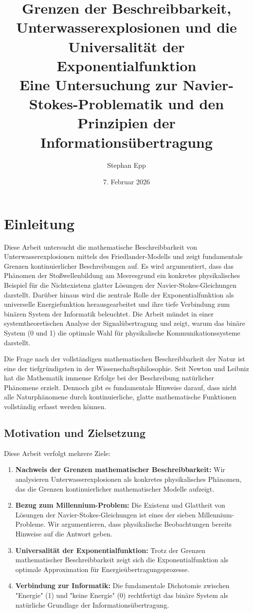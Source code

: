 ﻿\documentclass[12pt,a4paper]{article}
\title{\textbf{Grenzen der Beschreibbarkeit, Unterwasserexplosionen und die Universalität der Exponentialfunktion}\\
Eine Untersuchung zur Navier-Stokes-Problematik und den Prinzipien der Informationsübertragung}
\author{Stephan Epp}
\date{7. Februar 2026}
\theoremstyle{definition}
\theoremstyle{remark}
\begin{document}
\maketitle
\tableofcontents
\newpage

\section{Einleitung}
Diese Arbeit untersucht die mathematische Beschreibbarkeit von Unterwasserexplosionen mittels des Friedlander-Modells und zeigt fundamentale Grenzen kontinuierlicher Beschreibungen auf. Es wird argumentiert, dass das Phänomen der Stoßwellenbildung am Meeresgrund ein konkretes physikalisches Beispiel für die Nichtexistenz glatter Lösungen der Navier-Stokes-Gleichungen darstellt. Darüber hinaus wird die zentrale Rolle der Exponentialfunktion als universelle Energiefunktion herausgearbeitet und ihre tiefe Verbindung zum binären System der Informatik beleuchtet. Die Arbeit mündet in einer systemtheoretischen Analyse der Signalübertragung und zeigt, warum das binäre System (0 und 1) die optimale Wahl für physikalische Kommunikationssysteme darstellt.

Die Frage nach der vollständigen mathematischen Beschreibbarkeit der Natur ist eine der tiefgründigsten in der Wissenschaftsphilosophie. Seit Newton und Leibniz hat die Mathematik immense Erfolge bei der Beschreibung natürlicher Phänomene erzielt. Dennoch gibt es fundamentale Hinweise darauf, dass nicht alle Naturphänomene durch kontinuierliche, glatte mathematische Funktionen vollständig erfasst werden können.

\subsection{Motivation und Zielsetzung}

Diese Arbeit verfolgt mehrere Ziele:

\begin{enumerate}
\item \textbf{Nachweis der Grenzen mathematischer Beschreibbarkeit:} Wir analysieren Unterwasserexplosionen als konkretes physikalisches Phänomen, das die Grenzen kontinuierlicher mathematischer Modelle aufzeigt.

\item \textbf{Bezug zum Millennium-Problem:} Die Existenz und Glattheit von Lösungen der Navier-Stokes-Gleichungen ist eines der sieben Millennium-Probleme. Wir argumentieren, dass physikalische Beobachtungen bereits Hinweise auf die Antwort geben.

\item \textbf{Universalität der Exponentialfunktion:} Trotz der Grenzen mathematischer Beschreibbarkeit zeigt sich die Exponentialfunktion als optimale Approximation für Energieübertragungsprozesse.

\item \textbf{Verbindung zur Informatik:} Die fundamentale Dichotomie zwischen "Energie" (1) und "keine Energie" (0) rechtfertigt das binäre System als natürliche Grundlage der Informationsübertragung.
\end{enumerate}
\end{document}

